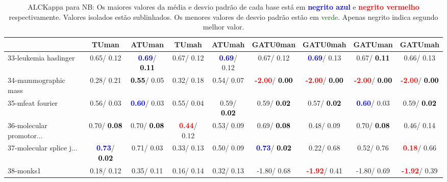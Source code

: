 \begin{table}[h]
\caption{ALCKappa para NB: Os maiores valores da média e desvio padrão de cada base está em \textcolor{blue}{\textbf{negrito azul}} e \textcolor{red}{\textbf{negrito vermelho}} respectivamente. Valores isolados estão sublinhados. Os menores valores de desvio padrão estão em \textcolor{darkgreen}{verde}. Apenas negrito indica segundo melhor valor.}
\begin{center}\begin{tabular}{lc|c|c|c|c|c|c|c}
 & TUman & \textbf{ATUman} & TUmah & \textbf{ATUmah} & GATU0man & GATU0mah & GATUman & GATUmah\\ \hline 33-leukemia haslinger &   0.65/  0.12 & \textcolor{blue}{\textbf{  0.69}}/\textcolor{black}{\textbf{  0.11}} &   0.67/  0.12 & \textcolor{blue}{\textbf{  0.69}}/  0.12 &   0.67/  0.12 & \textcolor{blue}{\textbf{  0.69}}/  0.13 &   0.67/\textcolor{black}{\textbf{  0.11}} &   0.66/  0.13 \\
34-mammographic mass &   0.28/  0.21 & \textcolor{black}{\textbf{  0.55}}/  0.05 &   0.32/  0.18 &   0.54/  0.07 & \textcolor{red}{\textbf{ -2.00}}/\textcolor{black}{\textbf{  0.00}} & \textcolor{red}{\textbf{ -2.00}}/\textcolor{black}{\textbf{  0.00}} & \textcolor{red}{\textbf{ -2.00}}/\textcolor{black}{\textbf{  0.00}} & \textcolor{red}{\textbf{ -2.00}}/\textcolor{black}{\textbf{  0.00}} \\
35-mfeat fourier &   0.56/  0.03 & \textcolor{blue}{\textbf{  0.60}}/  0.03 &   0.55/  0.04 &   0.59/\textcolor{black}{\textbf{  0.02}} &   0.59/\textcolor{black}{\textbf{  0.02}} &   0.57/\textcolor{black}{\textbf{  0.02}} & \textcolor{blue}{\textbf{  0.60}}/  0.03 &   0.59/\textcolor{black}{\textbf{  0.02}} \\
36-molecular promotor... &   0.70/\textcolor{black}{\textbf{  0.08}} &   0.70/\textcolor{black}{\textbf{  0.08}} & \textcolor{red}{\textbf{  0.44}}/  0.12 &   0.53/  0.09 &   0.69/\textcolor{black}{\textbf{  0.08}} &   0.48/  0.09 &   0.70/\textcolor{black}{\textbf{  0.08}} &   0.46/  0.14 \\
37-molecular splice j... & \textcolor{blue}{\textbf{  0.73}}/\textcolor{black}{\textbf{  0.02}} &   0.71/  0.03 &   0.33/  0.13 &   0.50/  0.09 & \textcolor{blue}{\textbf{  0.73}}/\textcolor{black}{\textbf{  0.02}} &   0.22/  0.68 &   0.52/  0.76 & \textcolor{red}{\textbf{  0.18}}/  0.66 \\
38-monks1 &   0.18/  0.12 &   0.35/  0.11 &   0.16/  0.14 &   0.32/  0.13 &  -1.80/  0.68 & \textcolor{red}{\textbf{ -1.92}}/  0.41 &  -1.80/  0.69 & \textcolor{red}{\textbf{ -1.92}}/  0.39 \\

\end{tabular}
\end{center}
\end{table}
